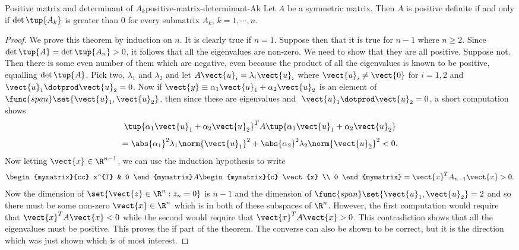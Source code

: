 \begin{theorem}{Positive matrix and determinant of $A_k$}{positive-matrix-determinant-Ak}   
Let $A$ be a symmetric matrix. Then $A$ is positive definite if
and only if $\det \tup{A_{k}}$ is greater than $0$ for every submatrix $A_{k}$,  $k=1,\cdots ,n$. 
\end{theorem}

\begin{proof}
We prove this theorem by induction on $n$. It is clearly
true if $n=1$. Suppose then that it is true for $n-1$ where $n\geq 2$. Since 
$\det \tup{A} =\det \tup{A_{n}} >0$, it follows that all the
eigenvalues are non-zero. We need to show that they are all positive. Suppose
not. Then there is some even number of them which are negative, even because
the product of all the eigenvalues is known to be positive, equalling $\det
\tup{A}$. Pick two, $\lambda _{1}$ and $\lambda _{2}$ and let $A
\vect{u}_{i}=\lambda _{i}\vect{u}_{i}$ where $\vect{u}_{i}\neq \vect{0}$ for $
i=1,2$ and $\vect{u}_{1}\dotprod \vect{u}_{2}=0$. Now if $\vect{y}\equiv \alpha
_{1}\vect{u}_{1}+\alpha _{2}\vect{u}_{2}$ is an element of $\func{span}\set{
\vect{u}_{1},\vect{u}_{2}}$, then since these are eigenvalues and $\ 
\vect{u}_{1}\dotprod \vect{u}_{2}=0$, a short computation shows 
\begin{equation*}
\tup{\alpha _{1}\vect{u}_{1}+\alpha _{2}\vect{u}_{2}} ^{T}A\tup{
\alpha _{1}\vect{u}_{1}+\alpha _{2}\vect{u}_{2}}
\end{equation*}
\begin{equation*}
=\abs{\alpha _{1}}^{2}\lambda _{1}\norm{\vect{u}
_{1}} ^{2}+\abs{\alpha _{2}}^{2}\lambda
_{2}\norm{\vect{u}_{2}} ^{2}<0.
\end{equation*}
Now letting $\vect{x}\in \R^{n-1}$, we can use the induction
hypothesis to write 
\begin{equation*}
\begin{mymatrix}{cc}
x^{T} & 0
\end{mymatrix} A\begin{mymatrix}{c}
\vect{x} \\ 
0
\end{mymatrix} =\vect{x}^{T}A_{n-1}\vect{x}>0.
\end{equation*}
Now the dimension of $\set{\vect{z}\in \R^{n}:z_{n}=0} $ is 
$n-1$ and the dimension of $\func{span}\set{\vect{u}_{1},\vect{u}
_{2}} =2$ and so there must be some non-zero $\vect{x}\in \R
^{n} $ which is in both of these subspaces of $\R^{n}$. However, the
first computation would require that $\vect{x}^{T}A\vect{x}<0$ while the
second would require that $\vect{x}^{T}A\vect{x}>0$. This contradiction shows
that all the eigenvalues must be positive. This proves the if part of the
theorem. The converse can also be shown to be correct, but it is the
direction which was just shown which is of most interest. 
\end{proof}

